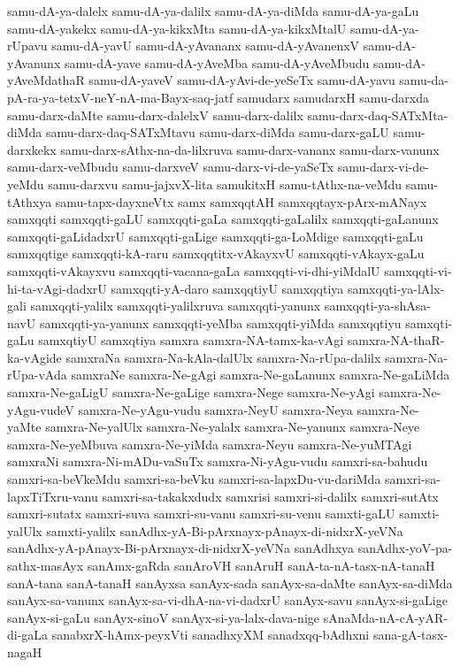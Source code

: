 {samu-dA-ya-dalelx
samu-dA-ya-dalilx
samu-dA-ya-diMda
samu-dA-ya-gaLu
samu-dA-yakekx
samu-dA-ya-kikxMta
samu-dA-ya-kikxMtalU
samu-dA-ya-rUpavu
samu-dA-yavU
samu-dA-yAvananx
samu-dA-yAvanenxV
samu-dA-yAvanunx
samu-dA-yave
samu-dA-yAveMba
samu-dA-yAveMbudu
samu-dA-yAveMdathaR
samu-dA-yaveV
samu-dA-yAvi-de-yeSeTx
samu-dA-yavu
samu-da-pA-ra-ya-tetxV-neY-nA-ma-Bayx-saq-jatf
samudarx
samudarxH
samu-darxda
samu-darx-daMte
samu-darx-dalelxV
samu-darx-dalilx
samu-darx-daq-SATxMta-diMda
samu-darx-daq-SATxMtavu
samu-darx-diMda
samu-darx-gaLU
samu-darxkekx
samu-darx-sAthx-na-da-lilxruva
samu-darx-vananx
samu-darx-vanunx
samu-darx-veMbudu
samu-darxveV
samu-darx-vi-de-yaSeTx
samu-darx-vi-de-yeMdu
samu-darxvu
samu-jajxvX-lita
samukitxH
samu-tAthx-na-veMdu
samu-tAthxya
samu-tapx-dayxneVtx
samx
samxqqtAH
samxqqtayx-pArx-mANayx
samxqqti
samxqqti-gaLU
samxqqti-gaLa
samxqqti-gaLalilx
samxqqti-gaLanunx
samxqqti-gaLidadxrU
samxqqti-gaLige
samxqqti-ga-LoMdige
samxqqti-gaLu
samxqqtige
samxqqti-kA-raru
samxqqtitx-vAkayxvU
samxqqti-vAkayx-gaLu
samxqqti-vAkayxvu
samxqqti-vacana-gaLa
samxqqti-vi-dhi-yiMdalU
samxqqti-vi-hi-ta-vAgi-dadxrU
samxqqti-yA-daro
samxqqtiyU
samxqqtiya
samxqqti-ya-lAlx-gali
samxqqti-yalilx
samxqqti-yalilxruva
samxqqti-yanunx
samxqqti-ya-shAsa-navU
samxqqti-ya-yanunx
samxqqti-yeMba
samxqqti-yiMda
samxqqtiyu
samxqti-gaLu
samxqtiyU
samxqtiya
samxra
samxra-NA-tamx-ka-vAgi
samxra-NA-thaR-ka-vAgide
samxraNa
samxra-Na-kAla-dalUlx
samxra-Na-rUpa-dalilx
samxra-Na-rUpa-vAda
samxraNe
samxra-Ne-gAgi
samxra-Ne-gaLanunx
samxra-Ne-gaLiMda
samxra-Ne-gaLigU
samxra-Ne-gaLige
samxra-Nege
samxra-Ne-yAgi
samxra-Ne-yAgu-vudeV
samxra-Ne-yAgu-vudu
samxra-NeyU
samxra-Neya
samxra-Ne-yaMte
samxra-Ne-yalUlx
samxra-Ne-yalalx
samxra-Ne-yanunx
samxra-Neye
samxra-Ne-yeMbuva
samxra-Ne-yiMda
samxra-Neyu
samxra-Ne-yuMTAgi
samxraNi
samxra-Ni-mADu-vaSuTx
samxra-Ni-yAgu-vudu
samxri-sa-bahudu
samxri-sa-beVkeMdu
samxri-sa-beVku
samxri-sa-lapxDu-vu-dariMda
samxri-sa-lapxTiTxru-vanu
samxri-sa-takakxdudx
samxrisi
samxri-si-dalilx
samxri-sutAtx
samxri-sutatx
samxri-suva
samxri-su-vanu
samxri-su-venu
samxti-gaLU
samxti-yalUlx
samxti-yalilx
sanAdhx-yA-Bi-pArxnayx-pAnayx-di-nidxrX-yeVNa
sanAdhx-yA-pAnayx-Bi-pArxnayx-di-nidxrX-yeVNa
sanAdhxya
sanAdhx-yoV-pa-sathx-masAyx
sanAmx-gaRda
sanAroVH
sanAruH
sanA-ta-nA-tasx-nA-tanaH
sanA-tana
sanA-tanaH
sanAyxsa
sanAyx-sada
sanAyx-sa-daMte
sanAyx-sa-diMda
sanAyx-sa-vanunx
sanAyx-sa-vi-dhA-na-vi-dadxrU
sanAyx-savu
sanAyx-si-gaLige
sanAyx-si-gaLu
sanAyx-sinoV
sanAyx-si-ya-lalx-dava-nige
sAnaMda-nA-cA-yAR-di-gaLa
sanabxrX-hAmx-peyxVti
sanadhxyXM
sanadxqq-bAdhxni
sana-gA-tasx-nagaH
}
